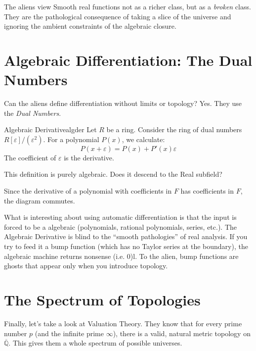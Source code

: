 \documentclass{article}
\newcommand{\Q}{{\mathbb{Q}}}
\newcommand{\oln}[1]{{\overline{#1}}}
\begin{document}
The aliens view Smooth real functions not as a richer class, but as a \emph{broken} class. They are the pathological consequence of taking a slice of the universe and ignoring the ambient constraints of the algebraic closure.

\section{Algebraic Differentiation: The Dual Numbers}

Can the aliens define differentiation without limits or topology? Yes. They use the \emph{Dual Numbers}.

\begin{defn}{Algebraic Derivative}{algder}
    Let $R$ be a ring. Consider the ring of dual numbers $R[\varepsilon]/(\varepsilon^2)$. For a polynomial $P(x)$, we calculate:
    \[ P(x + \varepsilon) = P(x) + P'(x)\varepsilon \]
    The coefficient of $\varepsilon$ is the derivative.
\end{defn}

This definition is purely algebraic. Does it descend to the Real subfield?

\begin{center}
\end{center}

Since the derivative of a polynomial with coefficients in $F$ has coefficients in $F$, the diagram commutes.

What is interesting about using automatic differentiation is that the input is forced to be a algebraic
(polynomials, rational polynomials, series, etc.). The Algebraic Derivative is blind to the ``smooth
pathologies'' of real analysis. If you try to feed it a bump function (which has no Taylor series at the
boundary), the algebraic machine returns nonsense (i.e. $0$)l. To the alien, bump functions are ghosts that appear only when you
introduce topology.

\section{The Spectrum of Topologies}

Finally, let's take a look at Valuation Theory. They know that for every prime number $p$ (and the infinite
prime $\infty$), there is a valid, natural metric topology on $\oln{\Q}$. This gives them a whole spectrum of
possible universes.
\end{document}

